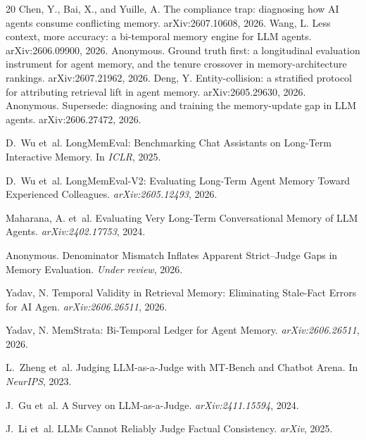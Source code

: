 \documentclass[10pt]{article}
\begin{document}
\begin{thebibliography}{20}
Chen, Y., Bai, X., and Yuille, A. The compliance trap: diagnosing how AI agents
consume conflicting memory. arXiv:2607.10608, 2026.
Wang, L. Less context, more accuracy: a bi-temporal memory engine
for LLM agents. arXiv:2606.09900, 2026.
Anonymous. Ground truth first: a longitudinal evaluation instrument for agent
memory, and the tenure crossover in memory-architecture rankings.
arXiv:2607.21962, 2026.
Deng, Y. Entity-collision: a stratified protocol for attributing retrieval lift
in agent memory. arXiv:2605.29630, 2026.
Anonymous. Supersede: diagnosing and training the memory-update gap in LLM
agents. arXiv:2606.27472, 2026.

D.~Wu et~al.
\newblock LongMemEval: Benchmarking Chat Assistants on Long-Term Interactive Memory.
\newblock In \emph{ICLR}, 2025.

D.~Wu et~al.
\newblock LongMemEval-V2: Evaluating Long-Term Agent Memory Toward Experienced Colleagues.
\newblock \emph{arXiv:2605.12493}, 2026.

Maharana, A. et~al.
\newblock Evaluating Very Long-Term Conversational Memory of LLM Agents.
\newblock \emph{arXiv:2402.17753}, 2024.

Anonymous.
\newblock Denominator Mismatch Inflates Apparent Strict--Judge Gaps in Memory Evaluation.
\newblock \emph{Under review}, 2026.

Yadav, N.
\newblock Temporal Validity in Retrieval Memory: Eliminating Stale-Fact Errors for AI Agen. \newblock \emph{arXiv:2606.26511}, 2026.


Yadav, N.
\newblock MemStrata: Bi-Temporal Ledger for Agent Memory.
\newblock \emph{arXiv:2606.26511}, 2026.

L.~Zheng et~al.
\newblock Judging LLM-as-a-Judge with MT-Bench and Chatbot Arena.
\newblock In \emph{NeurIPS}, 2023.

J.~Gu et~al.
\newblock A Survey on LLM-as-a-Judge.
\newblock \emph{arXiv:2411.15594}, 2024.

J.~Li et~al.
\newblock LLMs Cannot Reliably Judge Factual Consistency.
\newblock \emph{arXiv}, 2025.


\end{thebibliography}
\end{document}
